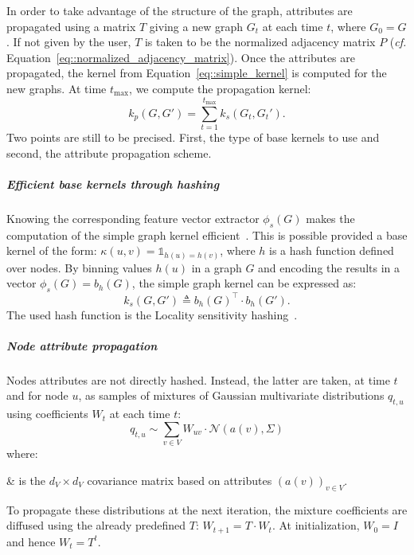                 In order to take advantage of the structure of the graph, attributes are propagated using a matrix $T$ giving a new graph $G_t$ at each time $t$, where $G_0 = G$.
                If not given by the user, \(T\) is taken to be the normalized adjacency matrix $P$ (\textit{cf.} Equation~\ref{eq::normalized_adjacency_matrix}).
                Once the attributes are propagated, the kernel from Equation~\ref{eq::simple_kernel} is computed for the new graphs.
                At time $t_{\max}$, we compute the propagation kernel:
                \begin{equation}
                    \label{eq::propagation_kernel}
                    k_p(G, G') = \sum_{t=1}^{t_{\max}} k_s(G_t, G_t').
                \end{equation}
                Two points are still to be precised.
                First, the type of base kernels to use and second, the attribute propagation scheme.\\

                \subparagraph{Efficient base kernels through hashing}
                    Knowing the corresponding feature vector extractor $\phi_s(G)$ makes the computation of the simple graph kernel efficient~\parencite{shervashidze2011weisfeiler,neumann2016propagation}.
                    This is possible provided a base kernel of the form: $\kappa(u, v) = \mathbb{1}_{h(u) = h(v)}$, where $h$ is a hash function defined over nodes.
                    By binning values $h(u)$ in a graph $G$ and encoding the results in a vector $\phi_s(G) = b_h(G)$, the simple graph kernel can be expressed as:
                    \begin{equation}
                        \label{eq::simple_kernel_binning}
                        k_s(G, G') \triangleq b_h(G)^\intercal\cdot b_h(G').
                    \end{equation}
                    The used hash function is the Locality sensitivity hashing~\parencite{neumann2016propagation}.\\

                \subparagraph{Node attribute propagation}
                    Nodes attributes are not directly hashed.
                    Instead, the latter are taken, at time $t$ and for node $u$, as samples of mixtures of Gaussian multivariate distributions $q_{t, u}$ using coefficients $W_t$ at each time $t$:
                    \begin{equation}
                        \label{eq::attribute_samples}
                        q_{t, u} \sim \sum_{v \in V} W_{uv}\cdot \mathscr{N}(a(v), \Sigma)
                    \end{equation}
                    where:
                    \begin{conditions}
                        \Sigma & is the $d_V \times d_V$ covariance matrix based on attributes $\left(a(v)\right)_{v\in V}$.
                    \end{conditions}
                    To propagate these distributions at the next iteration, the mixture coefficients are diffused using the already predefined $T$: $W_{t+1} = T\cdot W_t$.
                    At initialization, $W_0 = I$ and hence $W_t= T^t$.

